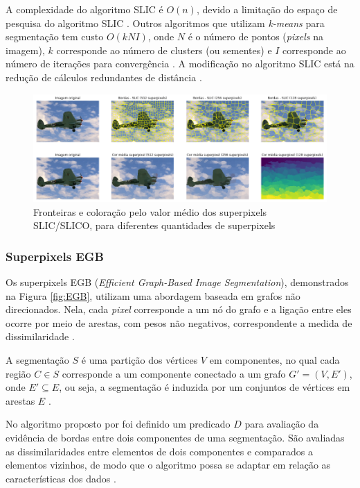 \begin{document}
A complexidade do algoritmo SLIC é $O(n)$, devido a limitação do espaço de pesquisa do algoritmo SLIC \cite{SLIC1}. Outros algoritmos que utilizam \textit{k-means} para segmentação tem custo $O(kNI)$, onde $N$ é o número de pontos (\textit{pixels} na imagem), $k$ corresponde ao número de clusters (ou sementes) e $I$ corresponde ao número de iterações para convergência \cite{SLIC1}. A modificação no algoritmo SLIC está na redução de cálculos redundantes de distância \cite{SLIC1}. 

\begin{figure}[ht]
\centering
\includegraphics[width=1.\textwidth]{slic_segmentation_compare.png}
\caption{Fronteiras e coloração pelo valor médio dos superpixels SLIC/SLICO, para diferentes quantidades de superpixels}
\label{fig:SLICO}
\end{figure}


\subsubsection{Superpixels EGB} \label{sssec:egb}

Os superpixels EGB (\textit{Efficient Graph-Based Image Segmentation}), demonstrados na Figura \ref{fig:EGB}, utilizam uma abordagem baseada em grafos não direcionados. Nela, cada \textit{pixel} corresponde a um nó do grafo e a ligação entre eles ocorre por meio de arestas, com pesos não negativos, correspondente a medida de dissimilaridade \cite{FELZENSZWALB}. 

A segmentação $S$ é uma partição dos vértices $V$ em componentes, no qual cada região $C \in S$ corresponde a um componente conectado a um grafo $G'=(V,E')$, onde $E' \subseteq E$, ou seja, a segmentação é induzida por um conjuntos de vértices em arestas $E$ \cite{FELZENSZWALB}.

No algoritmo proposto por \cite{FELZENSZWALB} foi definido um predicado $D$ para avaliação da evidência de bordas entre dois componentes de uma segmentação. São avaliadas as dissimilaridades entre elementos de dois componentes e comparados a elementos vizinhos, de modo que o algoritmo possa se adaptar em relação as características dos dados \cite{FELZENSZWALB}. 
\end{document}
